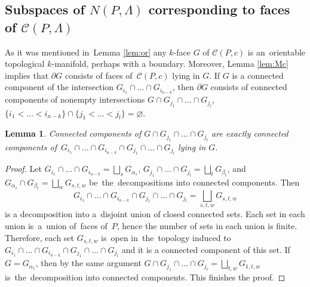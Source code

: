 \documentclass[12pt]{amsart}
\newtheorem{lemma}[formula]{Lemma}
\theoremstyle{definition}
\theoremstyle{remark}
\begin{document}
\subsection{Subspaces of $N(P,\Lambda)$ corresponding to faces of $\mathcal{C}(P,\Lambda)$}\label{ssec:faces}
As it was mentioned in~Lemma \ref{lem:or} any $k$-face $G$ of $\mathcal{C}(P,c)$ is
an~orientable topological $k$-manifold, perhaps with a boundary. Moreover, Lemma \ref{lem:Mc} implies that 
$\partial G$ consists of faces of~$\mathcal{C}(P,c)$ lying in $G$. If $G$ is a connected component 
of the intersection $G_{i_1}\cap\dots\cap G_{i_{n-k}}$, then $\partial G$ consists 
of connected components of nonempty intersections $G\cap G_{j_1}\cap\dots\cap G_{j_l}$, 
$\{i_1<\dots<i_{n-k}\}\cap \{j_1<\dots< j_l\}=\varnothing$.
\begin{lemma}\label{lem:cc}
Connected components of $G\cap G_{j_1}\cap\dots\cap G_{j_l}$ are exactly connected components
of~$G_{i_1}\cap\dots\cap G_{i_{n-k}}\cap G_{j_1}\cap\dots\cap G_{j_l}$ lying in $G$.
\end{lemma}
\begin{proof}
Let $G_{i_1}\cap\dots\cap G_{i_{n-k}}=\bigsqcup\limits_{s} G_{\alpha_s}$,
$G_{j_1}\cap\dots\cap G_{j_l}=\bigsqcup\limits_{t} G_{\beta_t}$, and 
$G_{\alpha_s}\cap G_{\beta_t}=\bigsqcup\limits_{w}G_{s,t,w}$ 
be~the~decompositions into connected components. Then
$$
G_{i_1}\cap\dots\cap G_{i_{n-k}}\cap G_{j_1}\cap\dots\cap G_{j_l}=
\bigsqcup\limits_{s,t,w}G_{s,t,w}
$$
is a decomposition into a~disjoint union of closed connected sets. 
Each set in each union is~a~union of~faces of~$P$, hence
the number of sets in each union is finite. Therefore, each set   $G_{s,t,w}$ is~open 
in~the~topology induced to $G_{i_1}\cap\dots\cap G_{i_{n-k}}\cap G_{j_1}\cap\dots\cap G_{j_l}$
and it is a connected component of this set.
If $G=G_{\alpha_1}$, then by the same argument 
$G\cap G_{j_1}\cap\dots\cap G_{j_l}=\bigsqcup\limits_{t,w}G_{1,t,w}$ is~the~decomposition
into connected components. This finishes the proof. 
\end{proof}
\end{document}
